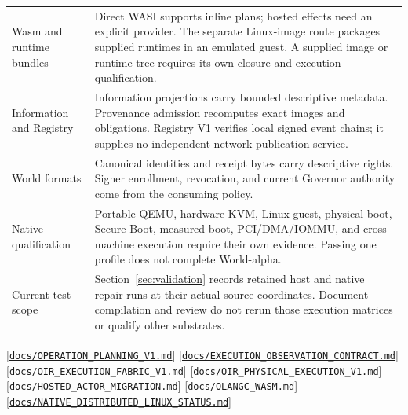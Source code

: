 \documentclass[11pt,oneside]{article}
\newcommand{\src}[1]{\textcolor{OSlate}{\scriptsize[\href{https://github.com/lostadi/OSTADIX/blob/c0b02c326b2329a95ba52447c7180bc93957cd57/#1}{\nolinkurl{#1}}]}\allowbreak}
\begin{document}
\begin{longtable}{P{0.23\textwidth} P{0.69\textwidth}}
Wasm and runtime bundles & Direct WASI supports inline plans; hosted effects
need an explicit provider. The separate Linux-image route packages supplied
runtimes in an emulated guest. A supplied image or runtime tree requires its
own closure and execution qualification. \\
Information and Registry & Information projections carry bounded descriptive
metadata. Provenance admission recomputes exact images and obligations.
Registry V1 verifies local signed event chains; it supplies no independent
network publication service. \\
World formats & Canonical identities and receipt bytes carry descriptive
rights. Signer enrollment, revocation, and current Governor authority come
from the consuming policy. \\
Native qualification & Portable QEMU, hardware KVM, Linux guest, physical boot,
Secure Boot, measured boot, PCI/DMA/IOMMU, and cross-machine execution require
their own evidence. Passing one profile does not complete World-alpha. \\
Current test scope & Section~\ref{sec:validation} records retained host and
native repair runs at their actual source coordinates. Document compilation
and review do not rerun those execution matrices or qualify other substrates. \\
\bottomrule
\end{longtable}
\endgroup

\src{docs/OPERATION_PLANNING_V1.md}
\src{docs/EXECUTION_OBSERVATION_CONTRACT.md}
\src{docs/OIR_EXECUTION_FABRIC_V1.md}
\src{docs/OIR_PHYSICAL_EXECUTION_V1.md}
\src{docs/HOSTED_ACTOR_MIGRATION.md}
\src{docs/OLANGC_WASM.md}
\src{docs/NATIVE_DISTRIBUTED_LINUX_STATUS.md}
\end{document}
